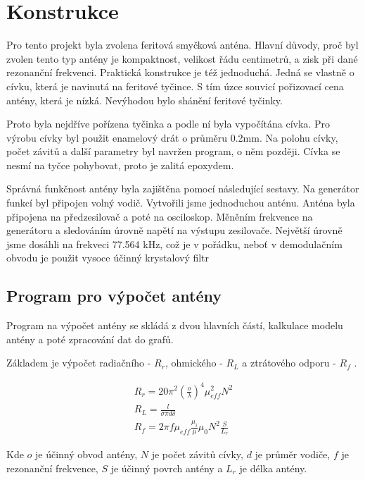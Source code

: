 \newpage

\section{Konstrukce}

Pro tento projekt byla zvolena feritová smyčková anténa. Hlavní důvody, proč byl
zvolen tento typ antény je kompaktnost, velikost řádu centimetrů, a zisk při dané
rezonanční frekvenci. Praktická konstrukce je též jednoduchá. Jedná se vlastně o cívku,
která je navinutá na feritové tyčince. S tím úzce souvicí pořizovací cena antény, která je
nízká. Nevýhodou bylo shánění feritové tyčinky.

Proto byla nejdříve pořízena tyčinka a podle ní byla vypočítána cívka. Pro výrobu cívky byl
použit enamelový drát o průměru 0.2mm. Na polohu cívky, počet závitů a další parametry
byl navržen program, o něm později. Cívka se nesmí na tyčce pohybovat, proto je zalitá
epoxydem.

Správná funkčnost antény byla zajištěna pomocí následující sestavy. Na generátor funkcí
byl připojen volný vodič. Vytvořili jsme
jednoduchou anténu. Anténa byla připojena na předzesilovač a poté na osciloskop. Měněním
frekvence na generátoru a sledováním úrovně napětí na výstupu zesilovače. Největší
úrovně jsme dosáhli na frekveci 77.564 kHz, což je v pořádku, neboť v
demodulačním obvodu je použit vysoce účinný krystalový filtr \cite{book01}

\subsection{Program pro výpočet antény}

Program na výpočet antény se skládá z dvou hlavních částí, kalkulace modelu antény a poté
zpracování dat do grafů.

Základem je výpočet radiačního - $R_r$, ohmického - $R_L$ a ztrátového odporu - $R_f$
\cite{book02}.

\begin{equation}
    \begin{gathered}
        R_r = 20\pi^2\left(\frac{o}{\lambda}\right)^4 \mu_{eff}^2 N^2 \\
        R_L = \frac{l}{\sigma\pi d \delta} \\
        R_f = 2 \pi f \mu_{eff} \frac{\mu_i}{\mu} \mu_0 N^2 \frac{S}{L_r}
    \end{gathered}
\end{equation}

Kde $o$ je účinný obvod antény, $N$ je počet závitů cívky, $d$ je průměr vodiče, $f$ je
rezonanční frekvence, $S$ je účinný povrch antény a $L_r$ je délka antény.

